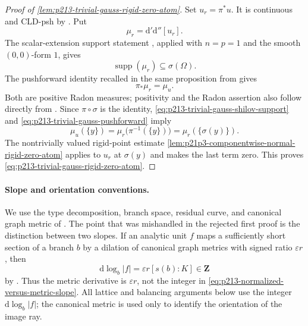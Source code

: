 \begin{proof}[Proof of
\cref{lem:p213-trivial-gauss-rigid-zero-atom}]
Set $u_r=\pi^*u$.  It is continuous and CLD-psh by
\cite[Proposition~8.1.5]{CLD25}.  Put
\[
                         \mu_r=\mathrm d'\mathrm d''[u_r].
\]
The scalar-extension support statement
\cite[Proposition~16.8.2]{CLD25}, applied with $n=p=1$ and the smooth
$(0,0)$-form $1$, gives
\begin{equation}
\label{eq:p213-trivial-gauss-shilov-support}
                         \operatorname{supp}(\mu_r)
                         \subseteq\sigma(\Omega).
\end{equation}
The pushforward identity recalled in the same proposition from
\cite[Proposition~8.7.5]{CLD25} gives
\begin{equation}
\label{eq:p213-trivial-gauss-pushforward}
                         \pi_*\mu_r=\mu_u.
\end{equation}
Both are positive Radon measures; positivity and the Radon assertion also
follow directly from \cite[Lemma~8.5.5 and Proposition~7.2.8]{CLD25}.
Since $\pi\circ\sigma$ is the identity,
\eqref{eq:p213-trivial-gauss-shilov-support} and
\eqref{eq:p213-trivial-gauss-pushforward} imply
\begin{equation}
\label{eq:p213-trivial-gauss-atom-transfer}
             \mu_u(\{y\})
             =\mu_r\bigl(\pi^{-1}(\{y\})\bigr)
             =\mu_r(\{\sigma(y)\}).
\end{equation}
The nontrivially valued rigid-point estimate
\cref{lem:p21p3-componentwise-normal-rigid-zero-atom} applies to
$u_r$ at $\sigma(y)$ and makes the last term zero.  This proves
\eqref{eq:p213-trivial-gauss-rigid-zero-atom}.
\end{proof}


\paragraph{Slope and orientation conventions.}
We use the type decomposition, branch space, residual curve, and canonical
graph metric of \cite[\S\S3.3--4.5]{Ducros24CurveStructure}.  The point
that was mishandled in the rejected first proof is the distinction between
two slopes.  If an analytic unit $f$ maps a sufficiently short section of
a branch $b$ by a dilation of canonical graph metrics with signed ratio
$\varepsilon r$, then
\begin{equation}
             \mathrm d\log_b|f|
                  =\varepsilon r [s(b):K]\in\mathbf Z
\label{eq:p213-normalized-versus-metric-slope}
\end{equation}
by \cite[\S4.5.21.4]{Ducros24CurveStructure}.  Thus the metric derivative
is $\varepsilon r$, not the integer in
\eqref{eq:p213-normalized-versus-metric-slope}.  All lattice and balancing
arguments below use the integer $\mathrm d\log_b|f|$; the canonical metric
is used only to identify the orientation of the image ray.

